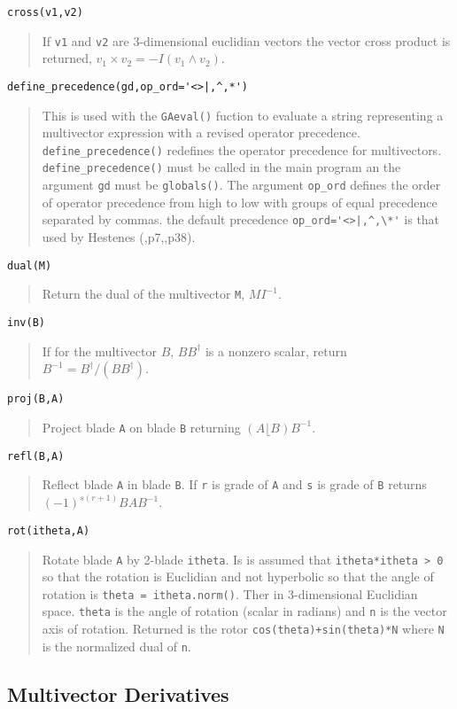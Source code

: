 \documentclass[10pt]{article}
\newcommand{\lp}{\left (}
\newcommand{\rp}{\right )}
\newcommand{\W}{\wedge}
\newcommand{\R}{\dagger}
\newcommand{\paren}[1]{\lp {#1} \rp}
\newcommand{\T}[1]{\texttt{#1}}
\begin{document}
\T{cross(v1,v2)}
\begin{quote}
   If \T{v1} and \T{v2} are 3-dimensional euclidian vectors the vector cross product is
   returned, $v_{1}\times v_{2} = -I\paren{v_{1}\W v_{2}}$.
\end{quote}
\lstinline$define_precedence(gd,op_ord='<>|,^,*')$
\begin{quote}
   This is used with the \T{GAeval()} fuction to evaluate a string representing a multivector
   expression with a revised operator precedence.  \T{define\_precedence()} redefines the operator
   precedence for multivectors. \T{define\_precedence()} must be called in the main program an the
   argument \T{gd} must be \T{globals()}.  The argument \T{op\_ord} defines the order of operator
   precedence from high to low with groups of equal precedence separated by commas. the default
   precedence \lstinline$op_ord='<>|,^,\*'$ is that used by Hestenes (\cite{Hestenes},p7,\cite{Doran},p38).
\end{quote}
\T{dual(M)}
\begin{quote}
   Return the dual of the multivector \T{M}, $MI^{-1}$.
\end{quote}
\T{inv(B)}
\begin{quote}
   If for the multivector $B$, $BB^{\R}$ is a nonzero scalar, return $B^{-1} = B^{\R}/(BB^{\R})$.
\end{quote}
\T{proj(B,A)}
\begin{quote}
   Project blade \T{A} on blade \T{B} returning $\paren{A\lfloor B}B^{-1}$.
\end{quote}
\T{refl(B,A)}
\begin{quote}
   Reflect blade \T{A} in blade \T{B}. If \T{r} is grade of \T{A} and \T{s} is grade of \T{B}
   returns $(-1)^{s(r+1)}BAB^{-1}$.
\end{quote}
\T{rot(itheta,A)}
\begin{quote}
   Rotate blade \T{A} by 2-blade \T{itheta}.  Is is assumed that \T{itheta*itheta > 0} so that
   the rotation is Euclidian and not hyperbolic so that the angle of
   rotation is \T{theta = itheta.norm()}.  Ther in 3-dimensional Euclidian space. \T{theta} is the angle of rotation (scalar in radians) and
   \T{n} is the vector axis of rotation.  Returned is the rotor \T{cos(theta)+sin(theta)*N} where \T{N} is
   the normalized dual of \T{n}.
\end{quote}

\subsection{Multivector Derivatives}
\end{document}
